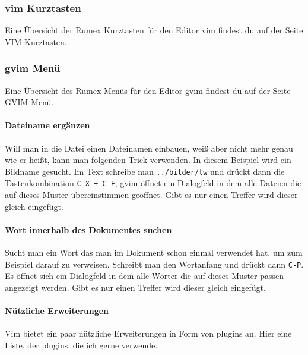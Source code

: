 \documentclass[%
fontsize=12pt,%
parskip=half,%
version=last%
]{scrreprt}
\begin{document}
\subsubsection{vim Kurztasten}\label{vim-kurztasten}

Eine Übersicht der Rumex Kurztasten für den Editor vim findest du auf
der Seite \href{vim-kurztasten.htm}{VIM-Kurztasten}.

\subsubsection{gvim Menü}\label{gvim-menuxfc}

Eine Übersicht des Rumex Menüs für den Editor gvim findest du auf der
Seite \href{gvim-menue.htm}{GVIM-Menü}.

\paragraph{Dateiname ergänzen}\label{dateiname-erguxe4nzen}

Will man in die Datei einen Dateinamen einbauen, weiß aber nicht mehr
genau wie er heißt, kann man folgenden Trick verwenden. In diesem
Beispiel wird ein Bildname gesucht. Im Text schreibe man
\texttt{../bilder/tw} und drückt dann die Tastenkombination
\texttt{C-X + C-F}, gvim öffnet ein Dialogfeld in dem alle Dateien die
auf dieses Muster übereinstimmen geöffnet. Gibt es nur einen Treffer
wird dieser gleich eingefügt.

\paragraph{Wort innerhalb des Dokumentes
suchen}\label{wort-innerhalb-des-dokumentes-suchen}

Sucht man ein Wort das man im Dokument schon einmal verwendet hat, um
zum Beispiel darauf zu verweisen. Schreibt man den Wortanfang und drückt
dann \texttt{C-P}. Es öffnet sich ein Dialogfeld in dem alle Wörter die
auf dieses Muster passen angezeigt werden. Gibt es nur einen Treffer
wird dieser gleich eingefügt.

\paragraph{Nützliche Erweiterungen}\label{nuxfctzliche-erweiterungen}

Vim bietet ein paar nützliche Erweiterungen in Form von plugins an. Hier
eine Liste, der plugins, die ich gerne verwende.
\end{document}

